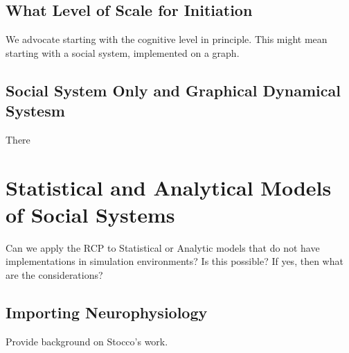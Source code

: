 \documentclass{article}
\begin{document}
\subsection{What Level of Scale for Initiation}
We advocate starting with the cognitive level in principle.  This might mean starting with a social system, implemented on a graph. 

\subsection{Social System Only and Graphical Dynamical Systesm}
There 

\section{Statistical and Analytical Models of Social Systems}
Can we apply the RCP to Statistical or Analytic models that do not have implementations in simulation environments?  Is this possible?  If yes, then what are the considerations?

\subsection{Importing Neurophysiology}
Provide background on Stocco's work.
\end{document}
